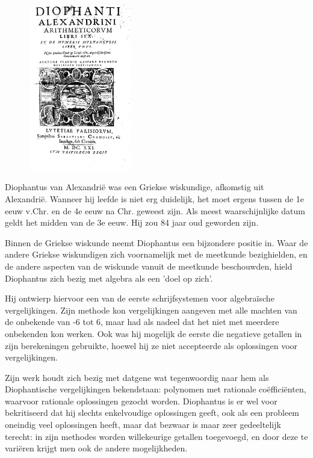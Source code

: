 \documentclass[12pt]{article}
\begin{document}
\begin{figure}
  \vspace{-2cm}
  \includegraphics[width=0.4\textwidth]{diophantus}
\end{figure}

\singlespacing

Diophantus van Alexandrië was een Griekse wiskundige, afkomstig uit Alexandrië. Wanneer hij leefde is niet erg duidelijk, het moet ergens tussen de 1e eeuw v.Chr. en de 4e eeuw na Chr. geweest zijn. Als meest waarschijnlijke datum geldt het midden van de 3e eeuw. Hij zou 84 jaar oud geworden zijn.

Binnen de Griekse wiskunde neemt Diophantus een bijzondere positie in. Waar de andere Griekse wiskundigen zich voornamelijk met de meetkunde bezighielden, en de andere aspecten van de wiskunde vanuit de meetkunde beschouwden, hield Diophantus zich bezig met algebra als een 'doel op zich'.

Hij ontwierp hiervoor een van de eerste schrijfsystemen voor algebraïsche vergelijkingen. Zijn methode kon vergelijkingen aangeven met alle machten van de onbekende van -6 tot 6, maar had als nadeel dat het niet met meerdere onbekenden kon werken. Ook was hij mogelijk de eerste die negatieve getallen in zijn berekeningen gebruikte, hoewel hij ze niet accepteerde als oplossingen voor vergelijkingen.

Zijn werk houdt zich bezig met datgene wat tegenwoordig naar hem als Diophantische vergelijkingen bekendstaan: polynomen met rationale coëfficiënten, waarvoor rationale oplossingen gezocht worden. Diophantus is er wel voor bekritiseerd dat hij slechts enkelvoudige oplossingen geeft, ook als een probleem oneindig veel oplossingen heeft, maar dat bezwaar is maar zeer gedeeltelijk terecht: in zijn methodes worden willekeurige getallen toegevoegd, en door deze te variëren krijgt men ook de andere mogelijkheden.
\end{document}
